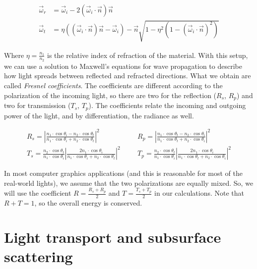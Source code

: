 \begin{equation*}
\begin{split}
\vec{\omega}_r &= \vec{\omega}_i - 2 (\vec{\omega}_i \cdot \vec{n}) \vec{n} \\
\vec{\omega}_t &= \eta ((\vec{\omega}_i \cdot \vec{n}) \vec{n} - \vec{\omega}_i) - \vec{n} \sqrt{1 - \eta^2 (1 - (\vec{\omega}_i \cdot \vec{n}) ^ 2)}
\end{split}
\end{equation*}

Where $\eta = \frac{n_1}{n_2}$ is the relative index of refraction of the material. With this setup, we can use a solution to Maxwell's equations for wave propagation to describe how light spreads between reflected and refracted directions. What we obtain are called \emph{Fresnel coefficients}. The coefficients are different according to the polarization of the incoming light, so there are two for the reflection ($R_s$, $R_p$) and two for transmission ($T_s$, $T_p$). The coefficients relate the incoming and outgoing power of the light, and by differentiation, the radiance as well.

\begin{equation*}
\begin{split}
R_s = \left|\frac{n_1 \cdot \cos\theta_i - n_2 \cdot \cos\theta_t} {n_1 \cdot \cos\theta_i + n_2 \cdot \cos\theta_t}\right|^2 \;\;\;&\;\;\; R_p = \left|\frac{n_1 \cdot \cos\theta_t - n_2 \cdot \cos\theta_i} {n_1 \cdot \cos\theta_t + n_2 \cdot \cos\theta_i}\right|^2\\
T_s = \frac{n_2 \cdot \cos\theta_t}{n_1 \cdot \cos\theta_i} \left|\frac{2 n_1 \cdot \cos\theta_i}{n_1 \cdot \cos\theta_i + n_2 \cdot \cos\theta_t}\right|^2 \;\;\;&\;\;\; T_p = \frac{n_2 \cdot \cos\theta_t}{n_1 \cdot \cos\theta_i}  \left|\frac{2 n_1 \cdot \cos\theta_i}{n_1 \cdot \cos\theta_t + n_2 \cdot \cos\theta_i}\right|^2
\end{split}
\end{equation*}


In most computer graphics applications (and this is reasonable for most of the real-world lights), we assume that the two polarizations are equally mixed. So, we will use the coefficient $R = \frac{R_s + R_p}{2}$ and $T = \frac{T_s + T_p}{2}$ in our calculations. Note that $R + T = 1$, so the overall energy is conserved.

\section{Light transport and subsurface scattering}

